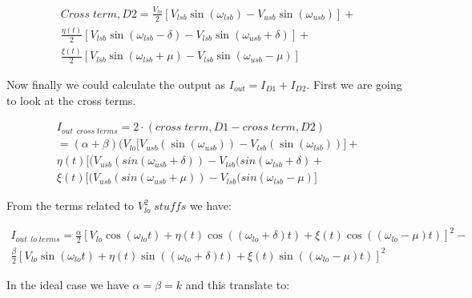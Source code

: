 \vspace{1cm}
\begin{equation}
    \boxed{
    \begin{gathered}
        Cross\;term,D2 = \frac{V_{lo}}{2}\left[
         V_{lsb}\sin(\omega_{lsb})-V_{usb}\sin(\omega_{usb})
        \right] + \\
        \frac{\eta(t)}{2} \left[
        V_{lsb}\sin(\omega_{lsb}-\delta)-V_{lsb}\sin(\omega_{usb}+\delta)
        \right] +\\
         \frac{\xi(t)}{2} \left[
        V_{lsb}\sin(\omega_{lsb}+\mu)-V_{lsb}\sin(\omega_{usb}-\mu)
        \right]
    \end{gathered}
    }
\end{equation}

\vspace{1cm}
Now finally we could calculate the output as $I_{out} = I_{D1}+I_{D2}$.
First we are going to look at the cross terms. 

\begin{equation}
    \boxed{
    \begin{gathered}
        I_{out}\;_{cross\; terms} = 2\cdot(cross\;term,D1-cross\;term,D2)\\
        =(\alpha+\beta)(V_{lo} \big[
        V_{usb}(\sin(\omega_{usb})) - V_{lsb}(
        \sin(\omega_{lsb})) \big] +\\
        \eta(t) \big[ (V_{usb} (sin(\omega_{usb}+\delta)
        )-V_{lsb}(sin(\omega_{lsb}+\delta)+\\
        \xi(t) \big[ (V_{usb} (sin(\omega_{usb}+\mu)
        )-V_{lsb}(sin(\omega_{lsb}-\mu)
        \big]
    \end{gathered}
    }
\end{equation}

\vspace{1cm}
From the terms related to $V_{lo}^2\;stuffs$ we have:

\begin{equation}
    \begin{gathered}
        I_{out}\;_{lo\;terms} =\frac{\alpha}{2}\left[ V_{lo}\cos(\omega_{lo}t)+\eta(t)\cos((\omega_{lo}+\delta)t)+\xi(t)\cos((\omega_{lo}-\mu)t)\right]^2-\\
        \frac{\beta}{2}\left[V_{lo}\sin(\omega_{lo}t)+\eta(t)\sin((\omega_{lo}+\delta)t)+\xi(t)\sin((\omega_{lo}-\mu)t)
        \right]^2
    \end{gathered}
\end{equation}

\vspace{0.5cm}
In the ideal case we have $\alpha = \beta = k$ and this translate to:

